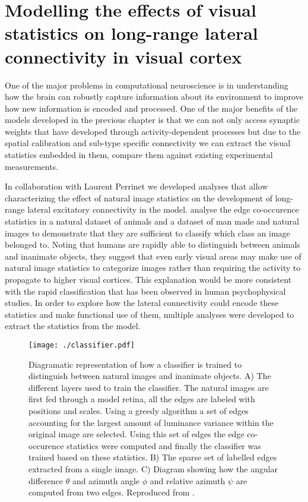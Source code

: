 \chapter{Modelling the effects of visual statistics on long-range lateral connectivity in visual cortex}

One of the major problems in computational neuroscience is in
understanding how the brain can robustly capture information about its
environment to improve how new information is encoded and
processed. One of the major benefits of the models developed in the
previous chapter is that we can not only access synaptic weights that
have developed through activity-dependent processes but due to the
spatial calibration and sub-type specific connectivity we can extract
the visual statistics embedded in them, compare them against existing
experimental measurements.

In collaboration with Laurent Perrinet we developed analyses that
allow characterizing the effect of natural image statistics on the
development of long-range lateral excitatory connectivity in the
model. \cite{Perrinet2015} analyse the edge co-occurence statistics in
a natural dataset of animals and a dataset of man made and natural
images to demonstrate that they are sufficient to classify which class
an image belonged to. Noting that humans are rapidly able to
distinguish between animals and inanimate objects, they suggest that
even early visual areas may make use of natural image statistics to
categorize images rather than requiring the activity to propagate to
higher visual cortices. This explanation would be more consistent with
the rapid classification that has been observed in human
psychophysical studies. In order to explore how the lateral
connectivity could encode these statistics and make functional use of
them, multiple analyses were developed to extract the statistics from
the model.

\begin{figure}
	\centering
    \texttt{[image: ./classifier.pdf]}
	\caption[] {Diagramatic representation of how a classifier is
      trained to distinguish between natural images and inanimate
      objects. A) The different layers used to train the
      classifier. The natural images are first fed through a model
      retina, all the edges are labeled with positions and
      scales. Using a greedy algorithm a set of edges accounting for
      the largest amount of luminance variance within the original
      image are selected. Using this set of edges the edge
      co-occurence statistics were computed and finally the classifier
      was trained based on these statistics. B) The sparse set
      of labelled edges extracted from a single image. C) Diagram
      showing how the angular difference $\theta$ and azimuth angle
      $\phi$ and relative azimuth $\psi$ are computed from two
      edges. Reproduced from \cite{Perrinet2015}.}
	\label{classifier}
\end{figure}

